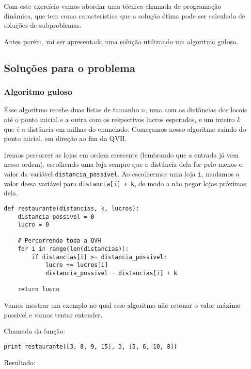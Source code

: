 \documentclass[11pt]{article}
\begin{document}
Com este exercício vamos abordar uma técnica chamada de programação
dinâmica, que tem como caracteristica que a solução ótima pode ser
calculada de soluções de subproblemas.

Antes porém, vai ser apresentado uma solução utilizando um algoritmo guloso.


\subsection{Soluções para o problema}
\label{sec-3-3}
\label{sec-3}

\subsubsection{Algoritmo guloso}
\label{sec-3-3-1}

\label{sec-3-3}

Esse algoritmo recebe duas listas de tamanho $n$, uma com as distâncias
dos locais até o ponto inicial e a outra com os respectivos lucros
esperados, e um inteiro $k$ que é a distância em milhas do enunciado.
Começamos nosso algoritmo saindo do ponto inicial, em direção ao fim
da QVH.

Iremos percorrer as lojas em ordem crescente (lembrando que a entrada
já vem nessa ordem), escolhendo uma loja sempre que a distância dela
for pelo menos o valor da variável \verb~distancia_possivel~. Ao escolhermos
uma loja \verb~i~, mudamos o valor dessa variável para \verb~distancia[i] + k~,
de modo a não pegar lojas próximas dela.

\begin{verbatim}
def restaurante(distancias, k, lucros):
    distancia_possivel = 0
    lucro = 0

    # Percorrendo toda a QVH
    for i in range(len(distancias)):
        if distancias[i] >= distancia_possivel:
            lucro += lucros[i]
            distancia_possivel = distancias[i] + k

    return lucro
\end{verbatim}


Vamos mostrar um exemplo no qual esse algoritmo não retonar o valor
máximo possivel e vamos tentar entender.


Chamada da função:

\begin{verbatim}
print restaurante([3, 8, 9, 15], 3, [5, 6, 10, 8])
\end{verbatim}

Resultado:
\end{document}
